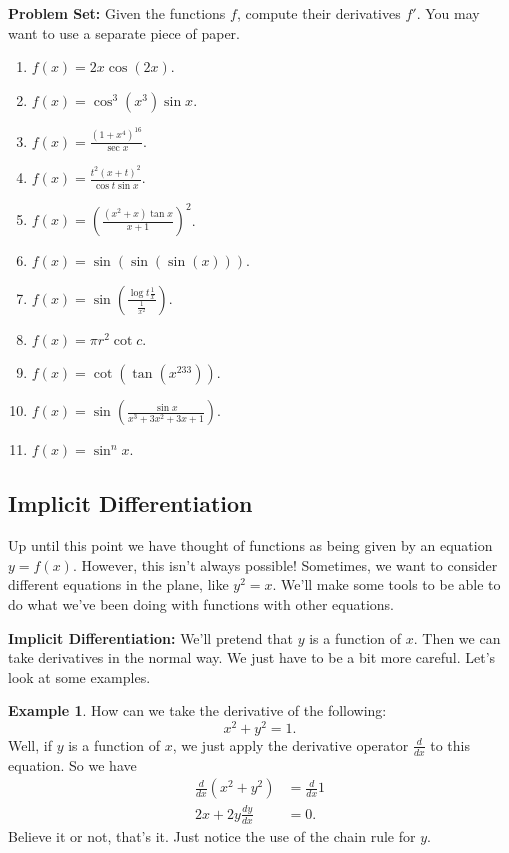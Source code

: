\documentclass[leqno]{article}
\theoremstyle{definition}
\newtheorem{example}{Example}[section]
\theoremstyle{remark}
\theoremstyle{theorem}
\begin{document}
\noindent \textbf{Problem Set:} Given the functions $f$, compute their derivatives $f'$. You may want to use a separate piece of paper.
\begin{enumerate}[1.]
\item $f(x)=2x \cos (2x)$.
\item $f(x)=\cos^3(x^3)\sin x$.\\
\item $f(x)=\frac{(1+x^4)^{16}}{\sec x}$.
\item $f(x)=\frac{t^2(x+t)^2}{\cos t \sin x}$.
\item $f(x)=\left( \frac{ (x^2+x)\tan x}{x+1} \right)^2$.
\item $f(x)= \sin(\sin(\sin(x)))$.
\item $f(x)= \sin\left( \frac{\log t \frac{1}{x}}{\frac{1}{x^2}} \right)$.
\item $f(x)= \pi r^2 \cot{c}$.
\item $f(x)=\cot(\tan (x^{233}))$.
\item $f(x)= \sin \left( \frac{ \sin x}{x^3+3x^2+3x+1} \right)$.
\item $f(x)= \sin^n x$.
\end{enumerate}


\subsection{Implicit Differentiation}

Up until this point we have thought of functions as being given by an equation $y=f(x)$.  However, this isn't always possible!  Sometimes, we want to consider different equations in the plane, like $y^2=x$.  We'll make some tools to be able to do what we've been doing with functions with other equations.  

\noindent \textbf{Implicit Differentiation:}
We'll pretend that $y$ is a function of $x$.  Then we can take derivatives in the normal way.  We just have to be a bit more careful.  Let's look at some examples.

\begin{example}
How can we take the derivative of the following:
\[
x^2+y^2=1.
\]
Well, if $y$ is a function of $x$, we just apply the derivative operator $\frac{d}{dx}$ to this equation. So we have
\begin{align*}
\frac{d}{dx} (x^2+y^2)&=\frac{d}{dx} 1\\
2x+2y\frac{dy}{dx}&= 0.
\end{align*}
Believe it or not, that's it.  Just notice the use of the chain rule for $y$.
\end{example}
\end{document}
